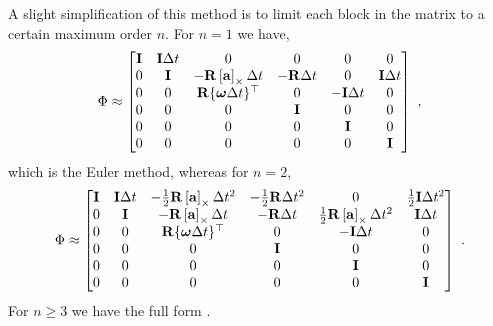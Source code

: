 A slight simplification of this method is to limit each block in the matrix to a certain maximum order $n$. 
For $n=1$ we have,
%
\begin{equation}
\Phi \approx \begin{bmatrix}
{\bf I} & {\bf I}\Delta t & 0 & 0 & 0 & 0 \\
0 & {\bf I} & -{\bf R}\left[{\bf a}\right]_\times\Delta t &  -{\bf R}\Delta t & 0 & {\bf I}\Delta t \\
0 & 0 & {\bf R}\{{\bm \omega}\Delta t\}^{\top} &  0 & -{\bf I}\Delta t & 0 \\
0 & 0 & 0 & {\bf I} & 0 & 0 \\
0 & 0 & 0 & 0 & {\bf I} & 0 \\
0 & 0 & 0 & 0 & 0 & {\bf I} \\
\end{bmatrix}~,\label{equ:FullIMU_PhiTrunc1}
\end{equation}
%
which is the Euler method, whereas for $n=2$,
%
\begin{equation}
\Phi \approx \begin{bmatrix}
{\bf I} & {\bf I}\Delta t & -\frac{1}{2}{\bf R}\left[{\bf a}\right]_\times\Delta t^2 &  -\tfrac12{\bf R}\Delta t^2 & 0 & \tfrac12{\bf I}\Delta t^2 \\
0 & {\bf I} & -{\bf R}\left[{\bf a}\right]_\times\Delta t &  -{\bf R}\Delta t & \frac{1}{2}{\bf R}\left[{\bf a}\right]_\times\Delta t^2 & {\bf I}\Delta t \\
0 & 0 & {\bf R}\{{\bm \omega}\Delta t\}^{\top} &  0 & -{\bf I}\Delta t & 0 \\
0 & 0 & 0 & {\bf I} & 0 & 0 \\
0 & 0 & 0 & 0 & {\bf I} & 0 \\
0 & 0 & 0 & 0 & 0 & {\bf I} \\
\end{bmatrix}~.\label{equ:FullIMU_PhiTrunc2}
\end{equation}
%
For $n\ge3$ we have the full form .
